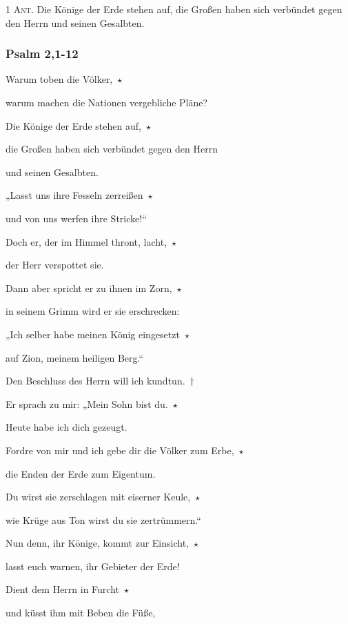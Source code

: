 \noindent \textsc{1 Ant.} Die Könige der Erde stehen auf, die Großen haben sich verbündet gegen den Herrn und seinen Gesalbten.

\subsubsection{Psalm 2,1-12}

\noindent Warum toben die Völker,~$\star$~\nopagebreak

warum machen die Nationen vergebliche Pläne?
 
\noindent Die Könige der Erde stehen auf,~$\star$~\nopagebreak

die Großen haben sich verbündet gegen den Herrn 

und seinen Gesalbten.
 
\noindent „Lasst uns ihre Fesseln zerreißen~$\star$~\nopagebreak

und von uns werfen ihre Stricke!“
 
\noindent Doch er, der im Himmel thront, lacht,~$\star$~\nopagebreak

der Herr verspottet sie.
 
\noindent Dann aber spricht er zu ihnen im Zorn,~$\star$~\nopagebreak

in seinem Grimm wird er sie erschrecken:
 
\noindent „Ich selber habe meinen König eingesetzt~$\star$~\nopagebreak

auf Zion, meinem heiligen Berg.“
 
\noindent Den Beschluss des Herrn will ich kundtun.~†~\nopagebreak

Er sprach zu mir: „Mein Sohn bist du.~$\star$~\nopagebreak

Heute habe ich dich gezeugt.
 
\noindent Fordre von mir und ich gebe dir die Völker zum Erbe,~$\star$~\nopagebreak

die Enden der Erde zum Eigentum.
 
\noindent Du wirst sie zerschlagen mit eiserner Keule,~$\star$~\nopagebreak

wie Krüge aus Ton wirst du sie zertrümmern.“
 
\noindent Nun denn, ihr Könige, kommt zur Einsicht,~$\star$~\nopagebreak

lasst euch warnen, ihr Gebieter der Erde!
 
\noindent Dient dem Herrn in Furcht~$\star$~\nopagebreak

und küsst ihm mit Beben die Füße,
 

